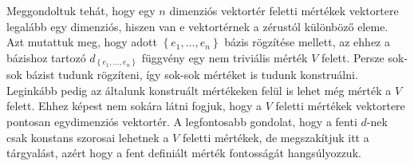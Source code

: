 \documentclass[9pt, a4paper, showtrims]{memoir}
\theoremstyle{plain}
\theoremstyle{remark}
\theoremstyle{definition}
\begin{document}
Meggondoltuk tehát,
hogy egy $n$ dimenziós vektortér feletti mértékek vektortere legalább egy dimenziós,
hiszen van e vektortérnek a zérustól különböző eleme.
Azt mutattuk meg, hogy
adott $\left\{ e_1,\ldots,e_n \right\}$ bázis rögzítése mellett,
az ehhez a bázishoz tartozó $d_{\left\{ e_1,\ldots,e_n \right\}}$ függvény egy nem triviális mérték $V$ felett.
Persze sok-sok bázist tudunk rögzíteni, így sok-sok mértéket is tudunk konstruálni.
Leginkább pedig az általunk konstruált mértékeken felül is lehet még mérték a $V$ felett.
Ehhez képest nem sokára látni fogjuk,
hogy a $V$ feletti mértékek vektortere pontosan egydimenziós vektortér.
A legfontosabb gondolat, hogy a fenti $d$-nek csak konstans szorosai lehetnek a $V$ feletti mértékek,
de megszakítjuk itt a tárgyalást, azért hogy a fent definiált mérték fontosságát hangsúlyozzuk.
\end{document}
